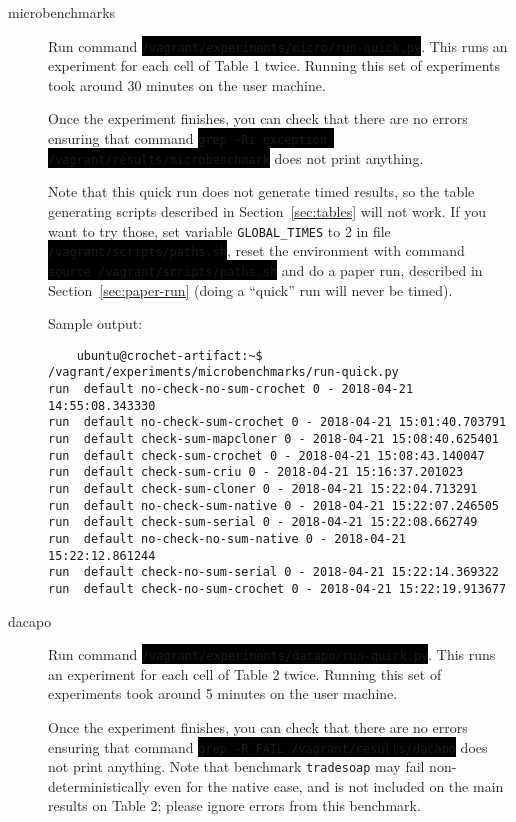 \documentclass[12pt]{article}
\newcommand{\command}[1]{\colorbox{black}{\texttt{\color{white}#1}}}
\begin{document}
\begin{description}

    \item[microbenchmarks] Run command
        \command{/vagrant/experiments/micro/run-quick.py}.  This runs an
        experiment for each cell of Table 1 twice.  Running this set of
        experiments took around 30 minutes on the user machine.

        Once the experiment finishes, you can check that there are no errors
        ensuring that command \command{grep -Ri exception /vagrant/results/microbenchmark}
        does not print anything.

        Note that this quick run does not generate timed results, so the
        table generating scripts described in Section~\ref{sec:tables} will not
        work.  If you want to try those, set variable \texttt{GLOBAL\_TIMES} to
        2 in file \command{/vagrant/scripts/paths.sh}, reset the environment with
        command \command{source /vagrant/scripts/paths.sh} and do a paper run,
        described in Section~\ref{sec:paper-run} (doing a ``quick'' run will never be timed).

Sample output:
\begin{verbatim}
	ubuntu@crochet-artifact:~$ /vagrant/experiments/microbenchmarks/run-quick.py 
run  default no-check-no-sum-crochet 0 - 2018-04-21 14:55:08.343330
run  default no-check-sum-crochet 0 - 2018-04-21 15:01:40.703791
run  default check-sum-mapcloner 0 - 2018-04-21 15:08:40.625401
run  default check-sum-crochet 0 - 2018-04-21 15:08:43.140047
run  default check-sum-criu 0 - 2018-04-21 15:16:37.201023
run  default check-sum-cloner 0 - 2018-04-21 15:22:04.713291
run  default no-check-sum-native 0 - 2018-04-21 15:22:07.246505
run  default check-sum-serial 0 - 2018-04-21 15:22:08.662749
run  default no-check-no-sum-native 0 - 2018-04-21 15:22:12.861244
run  default check-no-sum-serial 0 - 2018-04-21 15:22:14.369322
run  default check-no-sum-crochet 0 - 2018-04-21 15:22:19.913677
\end{verbatim}
    \item[dacapo] Run command \command{/vagrant/experiments/dacapo/run-quick.py}.
        This runs an experiment for each cell of Table 2 twice.  Running this
        set of experiments took around 5 minutes on the user machine.

        Once the experiment finishes, you can check that there are no errors
        ensuring that command \command{grep -R FAIL /vagrant/results/dacapo} does not
        print anything.  Note that benchmark \texttt{tradesoap} may fail
        non-deterministically even for the native case, and is not included on
        the main results on Table 2; please ignore errors from this benchmark.


\end{description}
\end{document}
